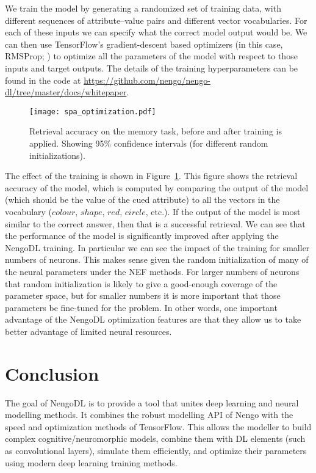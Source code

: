 \documentclass{article}
\begin{document}
We train the model by generating a randomized set of training data, with different sequences of attribute--value pairs and different vector vocabularies.  For each of these inputs we can specify what the correct model output would be.  We can then use TensorFlow's gradient-descent based optimizers (in this case, RMSProp; \citealt{Tieleman2012}) to optimize all the parameters of the model with respect to those inputs and target outputs.  The details of the training hyperparameters can be found in the code at \url{https://github.com/nengo/nengo-dl/tree/master/docs/whitepaper}.

\begin{figure}
\centering
\texttt{[image: spa\_optimization.pdf]}
\caption{Retrieval accuracy on the memory task, before and after training is applied.  Showing 95\% confidence intervals (for different random initializations).}
\label{fig:spa_optimization}
\end{figure}

The effect of the training is shown in Figure~\ref{fig:spa_optimization}.  This figure shows the retrieval accuracy of the model, which is computed by comparing the output of the model (which should be the value of the cued attribute) to all the vectors in the vocabulary ($colour$, $shape$, $red$, $circle$, etc.).  If the output of the model is most similar to the correct answer, then that is a successful retrieval.  We can see that the performance of the model is significantly improved after applying the NengoDL training.  In particular we can see the impact of the training for smaller numbers of neurons.  This makes sense given the random initialization of many of the neural parameters under the NEF methods. For larger numbers of neurons that random initialization is likely to give a good-enough coverage of the parameter space, but for smaller numbers it is more important that those parameters be fine-tuned for the problem.  In other words, one important advantage of the NengoDL optimization features are that they allow us to take better advantage of limited neural resources.

\section{Conclusion}

The goal of NengoDL is to provide a tool that unites deep learning and neural modelling methods.  It combines the robust modelling API of Nengo with the speed and optimization methods of TensorFlow.  This allows the modeller to build complex cognitive/neuromorphic models, combine them with DL elements (such as convolutional layers), simulate them efficiently, and optimize their parameters using modern deep learning training methods.
\end{document}

